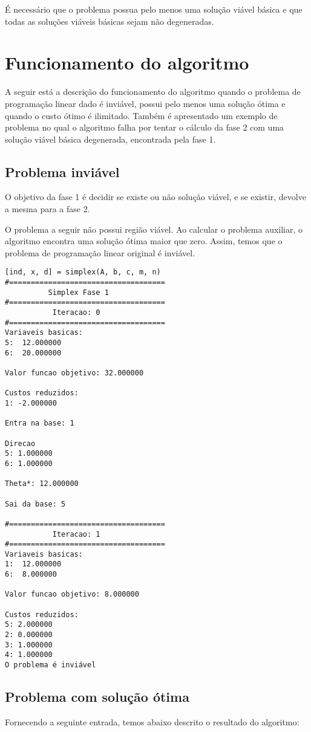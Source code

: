 \documentclass[
	12pt,				%
	openright,			%
	oneside,			%
	a4paper,			%
	english,			%
	french,				%
	spanish,			%
	brazil,				%
	]{abntex2}
\begin{document}
É necessário que o problema possua pelo menos uma solução viável básica e que todas as soluções viáveis básicas sejam não degeneradas.

\chapter{Funcionamento do algoritmo}

A seguir está a descrição do funcionamento do algoritmo quando o problema de
programação linear dado é inviável, possui pelo menos uma solução ótima e quando o custo 
ótimo é ilimitado. Também é apresentado um exemplo de problema no qual o algoritmo falha por tentar o cálculo da fase 2 com uma solução viável básica degenerada, encontrada pela fase 1.

\section{Problema inviável}
O objetivo da fase 1 é decidir se existe ou não solução viável, e se existir, devolve a mesma para a fase 2.

O problema a seguir não possui região viável. Ao calcular o problema auxiliar, o algoritmo encontra uma solução ótima maior que zero. Assim, temos que o problema de programação linear original é inviável.

\begin{verbatim}
[ind, x, d] = simplex(A, b, c, m, n)
#====================================
          Simplex Fase 1
#====================================
           Iteracao: 0
#====================================
Variaveis basicas:
5:  12.000000
6:  20.000000

Valor funcao objetivo: 32.000000

Custos reduzidos:
1: -2.000000

Entra na base: 1

Direcao
5: 1.000000
6: 1.000000

Theta*: 12.000000

Sai da base: 5

#====================================
           Iteracao: 1
#====================================
Variaveis basicas:
1:  12.000000
6:  8.000000

Valor funcao objetivo: 8.000000

Custos reduzidos:
5: 2.000000
2: 0.000000
3: 1.000000
4: 1.000000
O problema é inviável 
\end{verbatim}


\section{Problema com solução ótima}
Fornecendo a seguinte entrada, temos abaixo descrito o resultado do algoritmo:
\end{document}
